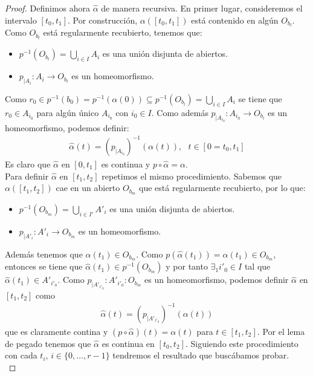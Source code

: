 \begin{lema}
\begin{proof}
        Definimos ahora $\hat{\alpha}$ de manera recursiva. En primer lugar, consideremos el intervalo $[t_0,t_1]$. Por construcción, $\alpha([t_0,t_1])$ está contenido en algún $O_{b_l}$. Como $O_{b_l}$ está regularmente recubierto, tenemos que:
        \begin{itemize}
            \item $p^{-1}(O_{b_l}) = \bigcup\limits_{i\in I} A_i$ es una unión disjunta de abiertos.
            \item $p_{|A_i}: A_i \to O_{b_l}$ es un homeomorfismo.
        \end{itemize}

       Como $r_0\in p^{-1}(b_0) = p^{-1}(\alpha(0)) \subseteq p^{-1}(O_{b_l}) = \bigcup\limits_{i\in I}A_i$ se tiene que $r_0\in A_{i_0}$ para algún único $A_{i_0}$ con $i_0\in I$. Como además $p_{|A_{i_0}}:A_{i_0} \to O_{b_l}$ es un homeomorfismo, podemos definir:
       \begin{gather*}
            \hat{\alpha}(t) = \left(p_{|A_{i_0}}\right)^{-1}(\alpha(t)),\ \ \ t\in [0=t_0, t_1]
       \end{gather*}
       Es claro que $\hat{\alpha}$ en $[0,t_1]$ es continua y $p\circ\hat{\alpha}=\alpha$.\\

       Para definir $\hat{\alpha}$ en $[t_1,t_2]$ repetimos el mismo procedimiento. Sabemos que $\alpha([t_1,t_2])$ cae en un abierto $O_{b_m}$ que está regularmente recubierto, por lo que:
       \begin{itemize}
            \item $p^{-1}(O_{b_m}) = \bigcup\limits_{i\in I'} A'_i$ es una unión disjunta de abiertos.
            \item $p_{|A'_i}: A'_i \to O_{b_m}$ es un homeomorfismo.
        \end{itemize}
       
        
       Además tenemos que $\alpha(t_1)\in O_{b_m}$. Como $p(\hat{\alpha}(t_1)) = \alpha(t_1)\in O_{b_m}$, entonces se tiene que $\hat{\alpha}(t_1)\in p^{-1}(O_{b_m})$ y por tanto $\exists_1 i'_0\in I$ tal que $\hat{\alpha}(t_1)\in A'_{i'_0}$. Como $p_{|A'_{i'_0}}:A'_{i'_0}:O_{b_m}$ es un homeomorfismo, podemos definir $\hat{\alpha}$ en $[t_1,t_2]$ como 
       \begin{gather*}
            \hat{\alpha}(t) = \left(p_{|A'_{i'_0}}\right)^{-1}(\alpha(t))    
       \end{gather*}
       que es claramente contina y $(p\circ \hat{\alpha})(t)=\alpha(t)$ para $t\in [t_1,t_2]$. Por el lema de pegado tenemos que $\hat{\alpha}$ es continua en $[t_0,t_2]$. Siguiendo este procedimiento con cada $t_i$, $i\in\{0,\dots,r-1\}$ tendremos el resultado que buscábamos probar.\\


\end{proof}
\end{lema}
